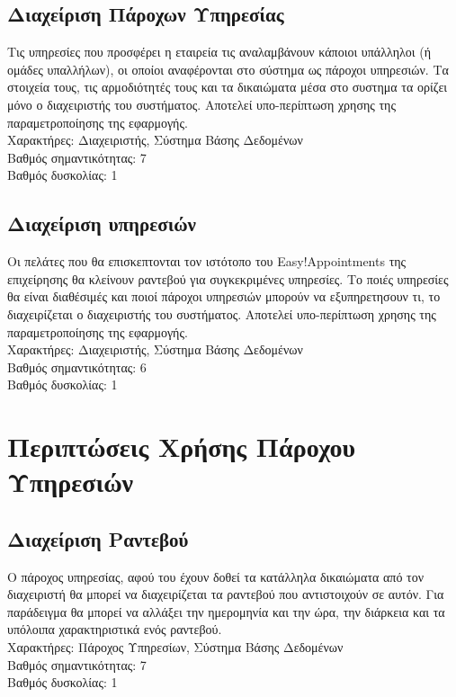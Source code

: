 \documentclass[12pt]{article}
\begin{document}
\subsection{Διαχείριση Πάροχων Υπηρεσίας}
Τις υπηρεσίες που προσφέρει η εταιρεία τις αναλαμβάνουν κάποιοι υπάλληλοι (ή ομάδες υπαλλήλων), οι οποίοι αναφέρονται στο σύστημα ως πάροχοι υπηρεσιών. Τα στοιχεία τους, τις αρμοδιότητές τους και τα δικαιώματα μέσα στο συστημα τα ορίζει μόνο ο διαχειριστής του συστήματος. Αποτελεί υπο-περίπτωση χρησης της παραμετροποίησης της εφαρμογής.
\\[0.3cm]
Χαρακτήρες: Διαχειριστής, Σύστημα Βάσης Δεδομένων
\\[0.3cm]
Βαθμός σημαντικότητας: 7
\\[0.3cm]
Βαθμός δυσκολίας: 1

\subsection{Διαχείριση υπηρεσιών}
Οι πελάτες που θα επισκεπτονται τον ιστότοπο του Easy!Appointments της επιχείρησης θα κλείνουν ραντεβού για συγκεκριμένες υπηρεσίες. Το ποιές υπηρεσίες θα είναι διαθέσιμές και ποιοί πάροχοι υπηρεσιών μπορούν να εξυπηρετησουν τι, το διαχειρίζεται ο διαχειριστής του συστήματος. Αποτελεί υπο-περίπτωση χρησης της παραμετροποίησης της εφαρμογής.
\\[0.3cm]
Χαρακτήρες: Διαχειριστής, Σύστημα Βάσης Δεδομένων
\\[0.3cm]
Βαθμός σημαντικότητας: 6 
\\[0.3cm]
Βαθμός δυσκολίας: 1

\section {Περιπτώσεις Χρήσης Πάροχου Υπηρεσιών}
\subsection{Διαχείριση Ραντεβού}
Ο πάροχος υπηρεσίας, αφού του έχουν δοθεί τα κατάλληλα δικαιώματα από τον διαχειριστή θα μπορεί να διαχειρίζεται τα ραντεβού που αντιστοιχούν σε αυτόν. Για παράδειγμα θα μπορεί να αλλάξει την ημερομηνία και την ώρα, την διάρκεια και τα υπόλοιπα χαρακτηριστικά ενός ραντεβού.
\\[0.3cm]
Χαρακτήρες: Πάροχος Υπηρεσίων, Σύστημα Βάσης Δεδομένων
\\[0.3cm]
Βαθμός σημαντικότητας: 7
\\[0.3cm]
Βαθμός δυσκολίας: 1
\end{document}
